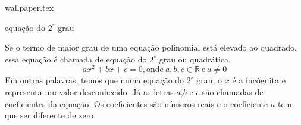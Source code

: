 \documentclass[10pt]{article}
\begin{document}
    {wallpaper.tex} %
        \begin{center}
            {\LARGE {\sc equação do \( 2^\circ \) grau}}
        \end{center}



\begin{definicao}
    Se o termo de maior grau de uma equação polinomial está elevado ao quadrado, essa equação é chamada de equação do \( 2^\circ \) grau ou quadrática.
    \[ ax^2+bx+c = 0\mathrm{, onde}~ a,b,c \in \mathbb{R}  ~\mathrm{e}~ a \neq 0 \]
    Em outras palavras, temos que numa equação do \( 2^\circ \) grau, o \( x \) é a incógnita e representa um valor desconhecido. Já as letras \( a \),\( b \) e \( c \) são chamadas de coeficientes da equação. Os coeficientes são números reais e o coeficiente \( a \) tem que ser diferente de zero.
\end{definicao}
\end{document}
